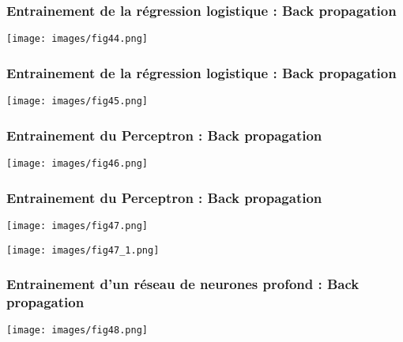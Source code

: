 \documentclass[9pt]{beamer}
\begin{document}
\begin{frame}
\frametitle{Entrainement de la régression logistique : Back propagation}
\begin{center}
\texttt{[image: images/fig44.png]}
\end{center}
\end{frame}

\begin{frame}
\frametitle{Entrainement de la régression logistique : Back propagation}
\begin{center}
\texttt{[image: images/fig45.png]}
\end{center}
\end{frame}

\begin{frame}
\frametitle{Entrainement du Perceptron : Back propagation}
\begin{center}
\texttt{[image: images/fig46.png]}
\end{center}
\end{frame}

\begin{frame}
\frametitle{Entrainement du Perceptron : Back propagation}
\begin{center}
\texttt{[image: images/fig47.png]}
\end{center}
\begin{center}
\texttt{[image: images/fig47\_1.png]}
\end{center}
\end{frame}

\begin{frame}
\frametitle{Entrainement d'un réseau de neurones profond : Back propagation}
\begin{center}
\texttt{[image: images/fig48.png]}
\end{center}
\end{frame}
\end{document}
